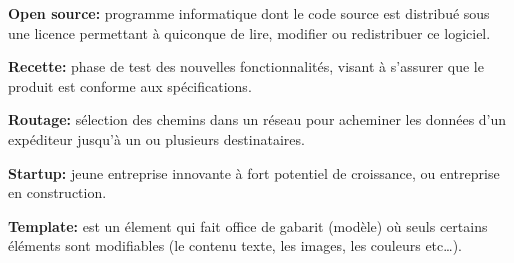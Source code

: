 \documentclass[12pt,a4paper]{article}
\begin{document}
  \bigskip

  \textbf{Open source:} programme informatique dont le code source est
  distribué sous une licence permettant à quiconque de lire, modifier ou
  redistribuer ce logiciel.

  \bigskip

  \textbf{Recette:} phase de test des nouvelles fonctionnalités, visant à
  s'assurer que le produit est conforme aux spécifications.

  \bigskip

  \textbf{Routage:} sélection des chemins dans un réseau pour acheminer
  les données d'un expéditeur jusqu'à un ou plusieurs destinataires.

  \bigskip

  \textbf{Startup:} jeune entreprise innovante à fort potentiel de
  croissance, ou entreprise en construction.

  \bigskip

  \textbf{Template:} est un élement qui fait office de gabarit (modèle) où
  seuls certains éléments sont modifiables (le contenu texte, les images,
  les couleurs etc\ldots{}).


  \newpage

  \listoffigures
\end{document}
